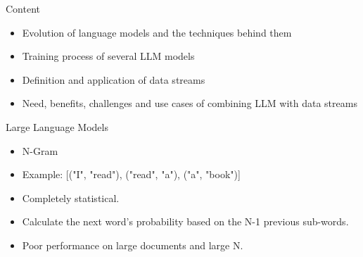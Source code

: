 \documentclass[t]{beamer}
\begin{document}
\begin{frame}{Content}
  \vspace{1cm}
  \begin{itemize}
    \item Evolution of language models and the techniques behind them
    \newline
    \item Training process of several LLM models
    \newline
    \item Definition and application of data streams
    \newline
    \item Need, benefits, challenges and use cases of combining LLM with data streams
  \end{itemize}
\end{frame}
\begin{frame}{Large Language Models}
  \vspace{3cm}
  \centering
\vspace{1cm}
\begin{itemize}
  \item N-Gram \cite{Cavnar94}
  \item Example: [("I", "read"), ("read", "a"), ("a", "book")]
  \item Completely statistical.
  \item Calculate the next word's probability based on the N-1 previous sub-words.
  \item Poor performance on large documents and large N.
\end{itemize}
\end{frame}
\end{document}
